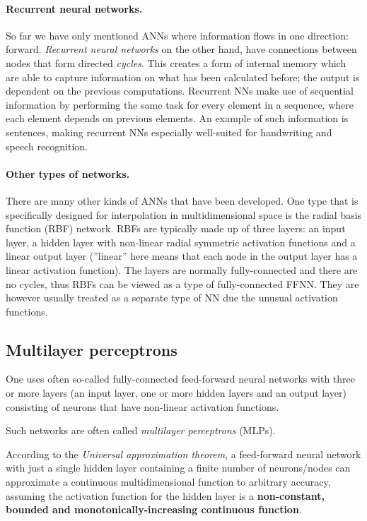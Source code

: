 \documentclass[%
oneside,                 %
final,                   %
10pt]{article}
\begin{document}
\paragraph{Recurrent neural networks.}
So far we have only mentioned ANNs where information flows in one
direction: forward. \emph{Recurrent neural networks} on the other hand,
have connections between nodes that form directed \emph{cycles}. This
creates a form of internal memory which are able to capture
information on what has been calculated before; the output is
dependent on the previous computations. Recurrent NNs make use of
sequential information by performing the same task for every element
in a sequence, where each element depends on previous elements. An
example of such information is sentences, making recurrent NNs
especially well-suited for handwriting and speech recognition.


\paragraph{Other types of networks.}
There are many other kinds of ANNs that have been developed. One type
that is specifically designed for interpolation in multidimensional
space is the radial basis function (RBF) network. RBFs are typically
made up of three layers: an input layer, a hidden layer with
non-linear radial symmetric activation functions and a linear output
layer (''linear'' here means that each node in the output layer has a
linear activation function). The layers are normally fully-connected
and there are no cycles, thus RBFs can be viewed as a type of
fully-connected FFNN. They are however usually treated as a separate
type of NN due the unusual activation functions.


\subsection{Multilayer perceptrons}

One uses often so-called fully-connected feed-forward neural networks
with three or more layers (an input layer, one or more hidden layers
and an output layer) consisting of neurons that have non-linear
activation functions.

Such networks are often called \emph{multilayer perceptrons} (MLPs).


According to the \emph{Universal approximation theorem}, a feed-forward
neural network with just a single hidden layer containing a finite
number of neurons/nodes can approximate a continuous multidimensional
function to arbitrary accuracy, assuming the activation function for
the hidden layer is a \textbf{non-constant, bounded and
monotonically-increasing continuous function}.
\end{document}
